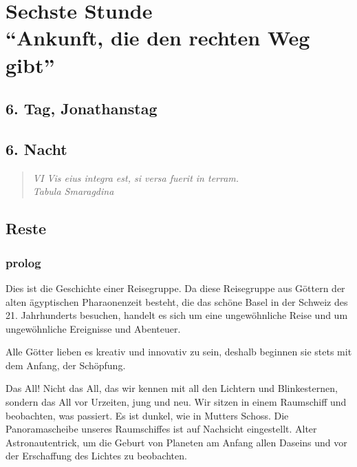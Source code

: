 \documentclass[11pt,titlepage,a5paper]{book}
\begin{document}
\part*{Sechste Stunde\\"`Ankunft, die den rechten Weg gibt"'}

\chapter*{6. Tag, Jonathanstag}

\chapter*{6. Nacht}


\begin{quotation}

\emph{VI Vis eius integra est, si versa fuerit in terram. \\Tabula Smaragdina}

\end{quotation}



\chapter*{Reste}

\section*{prolog}

Dies ist die Geschichte einer Reisegruppe. Da diese Reisegruppe aus Göttern der alten ägyptischen Pharaonenzeit besteht, die das schöne Basel in der Schweiz des 21. Jahrhunderts besuchen, handelt es sich um eine ungewöhnliche Reise und um ungewöhnliche Ereignisse und Abenteuer. 

Alle Götter lieben es kreativ und innovativ zu sein, deshalb beginnen sie stets mit dem Anfang, der Schöpfung. 

Das All!  Nicht das All, das wir kennen mit all den Lichtern und Blinkesternen, sondern das All vor Urzeiten, jung und neu. Wir sitzen in einem Raumschiff und beobachten, was passiert. Es ist dunkel, wie in Mutters Schoss. Die Panoramascheibe unseres Raumschiffes ist auf Nachsicht eingestellt. Alter Astronautentrick, um die Geburt von Planeten am Anfang allen Daseins und vor der Erschaffung des Lichtes zu beobachten.
\end{document}
